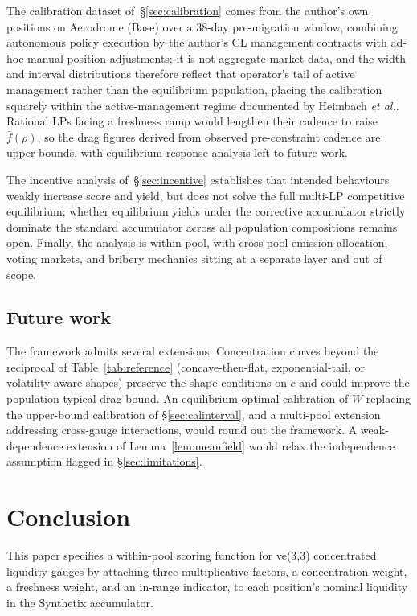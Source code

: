 \documentclass[11pt,a4paper]{article}
\theoremstyle{definition}
\theoremstyle{plain}
\theoremstyle{remark}
\begin{document}
The calibration dataset of~\S\ref{sec:calibration} comes from the author's own positions on Aerodrome (Base) over a 38-day pre-migration window, combining autonomous policy execution by the author's CL management contracts with ad-hoc manual position adjustments; it is not aggregate market data, and the width and interval distributions therefore reflect that operator's tail of active management rather than the equilibrium population, placing the calibration squarely within the active-management regime documented by Heimbach \emph{et al.}\cite{heimbach2022}. Rational LPs facing a freshness ramp would lengthen their cadence to raise $\bar f(\rho)$, so the drag figures derived from observed pre-constraint cadence are upper bounds, with equilibrium-response analysis left to future work.

The incentive analysis of~\S\ref{sec:incentive} establishes that intended behaviours weakly increase score and yield, but does not solve the full multi-LP competitive equilibrium; whether equilibrium yields under the corrective accumulator strictly dominate the standard accumulator across all population compositions remains open. Finally, the analysis is within-pool, with cross-pool emission allocation, voting markets, and bribery mechanics\cite{lloyd2023} sitting at a separate layer and out of scope.

\subsection{Future work}\label{sec:future}

The framework admits several extensions. Concentration curves beyond the reciprocal of Table~\ref{tab:reference} (concave-then-flat, exponential-tail, or volatility-aware shapes) preserve the shape conditions on $c$ and could improve the population-typical drag bound. An equilibrium-optimal calibration of $W$ replacing the upper-bound calibration of \S\ref{sec:calinterval}, and a multi-pool extension addressing cross-gauge interactions, would round out the framework. A weak-dependence extension of Lemma~\ref{lem:meanfield} would relax the independence assumption flagged in \S\ref{sec:limitations}.

\section{Conclusion}\label{sec:conclusion}

This paper specifies a within-pool scoring function for ve(3,3) concentrated liquidity gauges by attaching three multiplicative factors, a concentration weight, a freshness weight, and an in-range indicator, to each position's nominal liquidity in the Synthetix accumulator.
\end{document}
